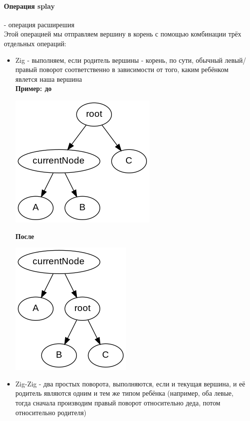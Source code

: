 \documentclass[a4paper,10pt]{article}
\begin{document}
\paragraph{Операция splay} - операция расширешия \\
Этой операцией мы отправляем вершину в корень с помощью комбинации трёх отдельных операций:
\begin{itemize}
	\item Zig - выполняем, если родитель вершины - корень, по сути, обычный левый/правый поворот соответственно в зависимости от того, каким ребёнком явлется наша вершина \\
	\textbf{Пример: до} \\
	\begin{center}\includegraphics[scale=0.7]{splayZigBefore.png}\end{center} 
	\textbf{После} \\
	\begin{center}\includegraphics[scale=0.7]{splayZigAfter.png}\end{center} 
	\item Zig-Zig - два простых поворота, выполняются, если и текущая вершина, и её родитель являются одним и тем же типом ребёнка (например, оба левые, тогда сначала производим правый поворот относительно деда, потом относительно родителя) \\

\end{itemize}
\end{document}
